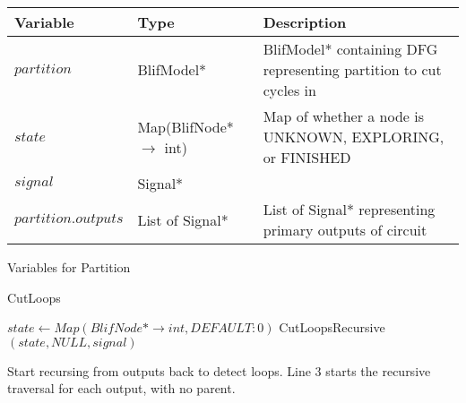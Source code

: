 \documentclass[12pt,draft,oneside]{article} %
\begin{document}
\begin{algorithm}
    \begin{center}
        \begin{tabularx}{\linewidth}{llX}
        \toprule
        Variable & Type & Description\\
        \midrule
        $partition$ & BlifModel* & BlifModel* containing DFG representing partition to cut cycles in\\
        $state$ & Map(BlifNode* $\to$ int) & Map of whether a node is UNKNOWN, EXPLORING, or FINISHED\\
        $signal$ & Signal* & \\
        $partition.outputs$ & List of Signal* & List of Signal* representing primary outputs of circuit\\
        \bottomrule
        \end{tabularx}
        \caption{Variables for Partition}
        \label{varPart}
    \end{center}
   \caption{CutLoops}\label{main}
   \begin{algorithmic}[1]
            \State $state \gets Map(BlifNode* \to int, DEFAULT: 0)$
               \State CutLoopsRecursive$(state, NULL, signal)$
            \EndFor
         \EndProcedure
   \end{algorithmic}
\end{algorithm}
Start recursing from outputs back to detect loops.
Line 3 starts the recursive traversal for each output, with no parent.

\newpage
\end{document}

